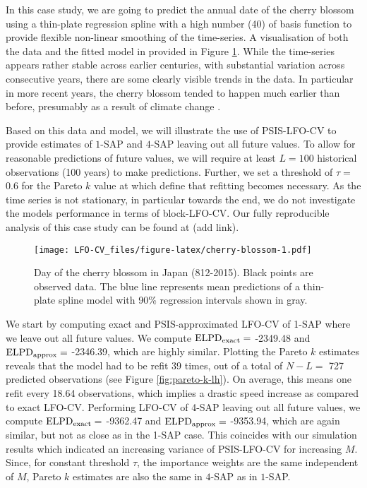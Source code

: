 \documentclass[american,]{article}
\begin{document}
In this case study, we are going to predict the annual date of the cherry
blossom using a thin-plate regression spline \citep{wood2003} with a high number (40)
of basis function to provide flexible non-linear smoothing of the time-series. A
visualisation of both the data and the fitted model in provided in Figure
\ref{fig:cherry-blossom}. While the time-series appears rather stable across
earlier centuries, with substantial variation across consecutive years, there
are some clearly visible trends in the data. In particular in more recent years,
the cherry blossom tended to happen much earlier than before, presumably as a
result of climate change \citep{aono2008, aono2010}.

Based on this data and model, we will illustrate the use of PSIS-LFO-CV to
provide estimates of \(1\)-SAP and \(4\)-SAP leaving out all future values. To allow
for reasonable predictions of future values, we will require at least \(L = 100\)
historical observations (100 years) to make predictions. Further, we set a
threshold of \(\tau =\) 0.6 for the Pareto \(k\) value at which define that
refitting becomes necessary. As the time series is not stationary, in particular
towards the end, we do not investigate the models performance in terms of
block-LFO-CV. Our fully reproducible analysis of this case study can be found at
(add link).

\begin{figure}
\centering
\texttt{[image: LFO-CV\_files/figure-latex/cherry-blossom-1.pdf]}
\caption{\label{fig:cherry-blossom}Day of the cherry blossom in Japan (812-2015). Black points are observed data. The blue line represents mean predictions of a thin-plate spline model with 90\% regression intervals shown in gray.}
\end{figure}

We start by computing exact and PSIS-approximated LFO-CV of 1-SAP where we leave
out all future values. We compute \({\rm ELPD}_{\rm exact} =\)
-2349.48 and \({\rm ELPD}_{\rm approx} =\)
-2346.39, which are highly similar. Plotting the
Pareto \(k\) estimates reveals that the model had to be refit 39 times,
out of a total of \(N - L =\) 727 predicted observations (see Figure
\ref{fig:pareto-k-lh}). On average, this means one refit every 18.64 observations, which implies a drastic speed increase as compared
to exact LFO-CV. Performing LFO-CV of 4-SAP leaving out all future values, we
compute \({\rm ELPD}_{\rm exact} =\) -9362.47 and \({\rm ELPD}_{\rm approx} =\) -9353.94, which are again
similar, but not as close as in the 1-SAP case. This coincides with our simulation
results which indicated an increasing variance of PSIS-LFO-CV for increasing \(M\).
Since, for constant threshold
\(\tau\), the importance weights are the same independent of \(M\), Pareto \(k\)
estimates are also the same in \(4\)-SAP as in \(1\)-SAP.
\end{document}
